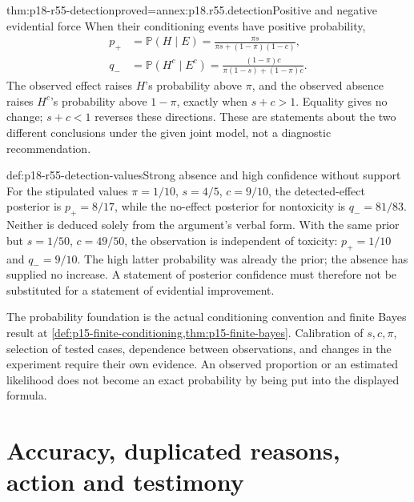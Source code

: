 \begin{hbtheorem}{thm:p18-r55-detection}{proved=annex:p18.r55.detection}{Positive and negative evidential force}
When their conditioning events have positive probability,
\[
\begin{split}
 p_+&=\mathbb P(H\mid E)
      =\frac{\pi s}{\pi s+(1-\pi)(1-c)},\\
 q_-&=\mathbb P(H^c\mid E^c)
      =\frac{(1-\pi)c}{\pi(1-s)+(1-\pi)c}.
\end{split}
\]
The observed effect raises \(H\)'s probability above \(\pi\),
and the observed absence raises \(H^c\)'s probability above \(1-\pi\),
exactly when \(s+c>1\). Equality gives no change; \(s+c<1\)
reverses these directions. These are statements about the two different
conclusions under the given joint model, not a diagnostic recommendation.
\end{hbtheorem}

\begin{hbexample}{def:p18-r55-detection-values}{Strong absence and high confidence without support}
For the stipulated values \(\pi=1/10\), \(s=4/5\), \(c=9/10\),
the detected-effect posterior is \(p_+=8/17\), while the no-effect
posterior for nontoxicity is \(q_-=81/83\). Neither is deduced solely
from the argument's verbal form. With the same prior but
\(s=1/50\), \(c=49/50\), the observation is independent of
toxicity: \(p_+=1/10\) and \(q_-=9/10\). The high latter
probability was already the prior; the absence has supplied no increase.
A statement of posterior confidence must therefore not be substituted
for a statement of evidential improvement.
\end{hbexample}

The probability foundation is the actual conditioning convention and
finite Bayes result at
\cref{def:p15-finite-conditioning,thm:p15-finite-bayes}.
Calibration of \(s,c,\pi\), selection of tested cases, dependence
between observations, and changes in the experiment require their own
evidence. An observed proportion or an estimated likelihood does not
become an exact probability by being put into the displayed formula.

\section{Accuracy, duplicated reasons, action and testimony}

